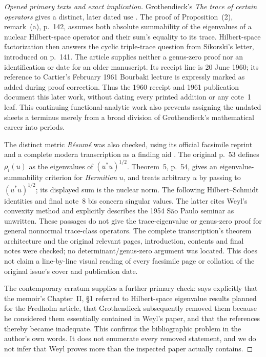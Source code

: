 \begin{proof}[Opened primary texts and exact implication]
Grothendieck's \emph{The trace of certain operators} gives a distinct,
later dated use \cite[pp.~141--143]{algGrothendieckTrace1961}.
The proof of Proposition~(2), remark~(a), p.~142, assumes both absolute
summability of the eigenvalues of a nuclear Hilbert-space operator and
their sum's equality to its trace. Hilbert-space factorization then
answers the cyclic triple-trace question from Sikorski's letter,
introduced on p.~141. The article supplies neither a genus-zero proof
nor an identification or date for an older manuscript. Its receipt line
is 20 June 1960; its reference to Cartier's February 1961 Bourbaki lecture
is expressly marked as added during proof correction. Thus the
1960 receipt and 1961 publication document this later work, without
dating every printed addition or any cote~1 leaf. This continuing
functional-analytic work also prevents assigning the undated sheets
a terminus merely from a broad division of Grothendieck's mathematical
career into periods.

The distinct metric \emph{R\'esum\'e} was also checked, using its official
facsimile reprint and a complete modern transcription as a finding aid
\cite[\S3, no.~6, pp.~53--56; final note 8 bis, p.~77]{algMetricResumeFacsimile}.
The original p.~53 defines $\rho_i(u)$ as the eigenvalues of
$(u^*u)^{1/2}$. Theorem~5, p.~54, gives an eigenvalue-summability criterion
for \emph{Hermitian} $u$, and treats arbitrary $u$ by passing to
$(u^*u)^{1/2}$; its displayed sum is the nuclear norm. The following
Hilbert--Schmidt identities and final note~8 bis concern singular values.
The latter cites Weyl's convexity method and explicitly describes the
1954 S\~ao Paulo seminar as unwritten. These passages do not give the
trace-eigenvalue or genus-zero proof for general nonnormal trace-class
operators. The complete transcription's theorem architecture and the
original relevant pages, introduction, contents and final notes were
checked; no determinant/genus-zero argument was located. This does not
claim a line-by-line visual reading of every facsimile page or collation
of the original issue's cover and publication date.

The contemporary erratum supplies a further primary check:
\cite[p.~119]{Grothendieck1956Erratum} says explicitly that the memoir's
Chapter~II, \S1 referred to Hilbert-space eigenvalue results planned for the
Fredholm article, that Grothendieck subsequently removed them because he
considered them essentially contained in Weyl's paper, and that the
references thereby became inadequate. This confirms the bibliographic
problem in the author's own words. It does not enumerate every removed
statement, and we do not infer that Weyl proves more than the inspected
paper actually contains.
\end{proof}

